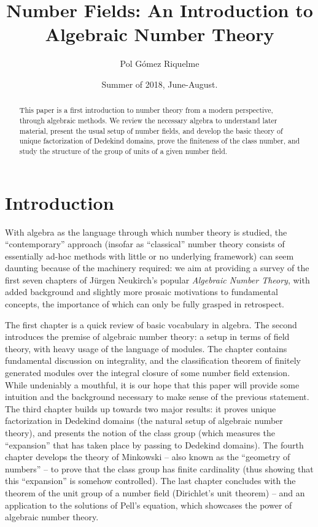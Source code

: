 \documentclass[psamsfonts]{amsart}
\title{Number Fields: An Introduction to Algebraic Number Theory}
\author{Pol Gómez Riquelme}
\date{Summer of 2018, June-August.}
\theoremstyle{definition}
\theoremstyle{remark}
\numberwithin{equation}{section}
\begin{document}
\begin{abstract}

This paper is a first introduction to number theory from a modern perspective, through algebraic methods. We review the necessary algebra to understand later material, present the usual setup of number fields, and develop the basic theory of unique factorization of Dedekind domains, prove the finiteness of the class number, and study the structure of the group of units of a given number field.

\end{abstract}

\maketitle

\tableofcontents

\section*{Introduction}

With algebra as the language through which number theory is studied, the ``contemporary'' approach (insofar as ``classical'' number theory consists of essentially ad-hoc methods with little or no underlying framework) can seem daunting because of the machinery required: we aim at providing a survey of the first seven chapters of Jürgen Neukirch's popular \emph{Algebraic Number Theory}, with added background and slightly more prosaic motivations to fundamental concepts, the importance of which can only be fully grasped in retrospect.

The first chapter is a quick review of basic vocabulary in algebra. The second introduces the premise of algebraic number theory: a setup in terms of field theory, with heavy usage of the language of modules. The chapter contains fundamental discussion on integrality, and the classification theorem of finitely generated modules over the integral closure of some number field extension. While undeniably a mouthful, it is our hope that this paper will provide some intuition and the background necessary to make sense of the previous statement. The third chapter builds up towards two major results: it proves unique factorization in Dedekind domains (the natural setup of algebraic number theory), and presents the notion of the class group (which measures the ``expansion'' that has taken place by passing to Dedekind domains). The fourth chapter develops the theory of Minkowski -- also known as the ``geometry of numbers'' -- to prove that the class group has finite cardinality (thus showing that this ``expansion'' is somehow controlled). The last chapter concludes with the theorem of the unit group of a number field (Dirichlet's unit theorem) -- and an application to the solutions of Pell's equation, which showcases the power of algebraic number theory.
\end{document}
